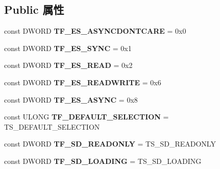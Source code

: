 \subsection*{Public 属性}
\begin{DoxyCompactItemize}
\item 
\mbox{\label{interface_i_tf_context_a7178715c930e81abd8a0c8d912a2aca9}} 
const D\+W\+O\+RD {\bfseries T\+F\+\_\+\+E\+S\+\_\+\+A\+S\+Y\+N\+C\+D\+O\+N\+T\+C\+A\+RE} = 0x0
\item 
\mbox{\label{interface_i_tf_context_aff90d1e65d055cbbb54582f0ed7a4e48}} 
const D\+W\+O\+RD {\bfseries T\+F\+\_\+\+E\+S\+\_\+\+S\+Y\+NC} = 0x1
\item 
\mbox{\label{interface_i_tf_context_a87823bfbd5a94895506781040bc9e13b}} 
const D\+W\+O\+RD {\bfseries T\+F\+\_\+\+E\+S\+\_\+\+R\+E\+AD} = 0x2
\item 
\mbox{\label{interface_i_tf_context_aa92c574a4495c920e915ace5c5cde9dc}} 
const D\+W\+O\+RD {\bfseries T\+F\+\_\+\+E\+S\+\_\+\+R\+E\+A\+D\+W\+R\+I\+TE} = 0x6
\item 
\mbox{\label{interface_i_tf_context_a4542147840203bd967a187e2fd1c1857}} 
const D\+W\+O\+RD {\bfseries T\+F\+\_\+\+E\+S\+\_\+\+A\+S\+Y\+NC} = 0x8
\item 
\mbox{\label{interface_i_tf_context_a313cff53cf7955891c3b188a3553d33f}} 
const U\+L\+O\+NG {\bfseries T\+F\+\_\+\+D\+E\+F\+A\+U\+L\+T\+\_\+\+S\+E\+L\+E\+C\+T\+I\+ON} = T\+S\+\_\+\+D\+E\+F\+A\+U\+L\+T\+\_\+\+S\+E\+L\+E\+C\+T\+I\+ON
\item 
\mbox{\label{interface_i_tf_context_a365f91d0250544ab4d626c12a46d1598}} 
const D\+W\+O\+RD {\bfseries T\+F\+\_\+\+S\+D\+\_\+\+R\+E\+A\+D\+O\+N\+LY} = T\+S\+\_\+\+S\+D\+\_\+\+R\+E\+A\+D\+O\+N\+LY
\item 
\mbox{\label{interface_i_tf_context_a3adee79388789d5b05161b7aa583b442}} 
const D\+W\+O\+RD {\bfseries T\+F\+\_\+\+S\+D\+\_\+\+L\+O\+A\+D\+I\+NG} = T\+S\+\_\+\+S\+D\+\_\+\+L\+O\+A\+D\+I\+NG
\item 

\end{DoxyCompactItemize}
